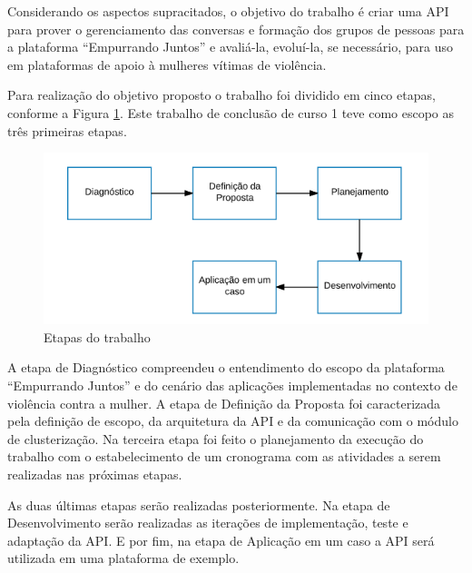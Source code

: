 Considerando os aspectos supracitados, o objetivo do trabalho é criar uma API para prover o gerenciamento das conversas e formação
dos grupos de pessoas para a plataforma ``Empurrando Juntos'' e avaliá-la, evoluí-la, se necessário, para uso 
em plataformas de apoio à mulheres vítimas de violência.



Para realização do objetivo proposto o trabalho foi dividido em cinco etapas, conforme a Figura \ref{fig:etapas_trabalho}. Este trabalho de conclusão de curso 1 
teve como escopo as três primeiras etapas.

\begin{figure}[h!]
\centering
\includegraphics[scale=0.6]{figuras/etapas.png}
\caption{Etapas do trabalho}
\label{fig:etapas_trabalho}
\end{figure}

A etapa de Diagnóstico compreendeu o entendimento do escopo da plataforma ``Empurrando Juntos'' e do cenário das 
aplicações implementadas no contexto de violência contra a mulher. A etapa de Definição da Proposta foi caracterizada pela definição de escopo, 
da arquitetura da API e da comunicação com o módulo de clusterização. Na terceira etapa foi feito o planejamento da execução do trabalho com o estabelecimento
de um cronograma com as atividades a serem realizadas nas próximas etapas. 

As duas últimas etapas serão realizadas posteriormente. Na etapa de Desenvolvimento
serão realizadas as iterações de implementação, teste e adaptação da API. E por fim, na etapa de Aplicação em um caso a API será utilizada em uma plataforma de exemplo.



